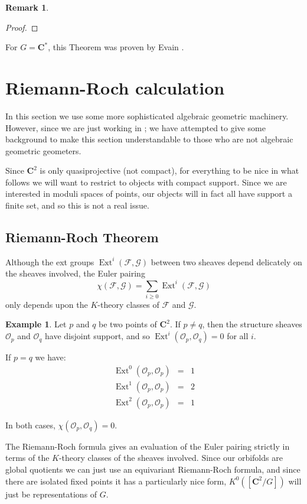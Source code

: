 \documentclass{amsart}[12pt]
\theoremstyle{definition}
\newtheorem{example}[dummy]{Example}
\newtheorem{remark}[dummy]{Remark}
\newcommand{\C}{\mathbf{C}}
\DeclareMathOperator{\Ext}{Ext}
\begin{document}
\begin{remark}
\begin{proof}
\end{proof}
For $G=\C^*$, this Theorem was proven by Evain \cite{evain1}.


\section{Riemann-Roch calculation}

In this section we use some more sophisticated algebraic geometric machinery.  However, since we are just working in ; we have attempted to give some background to make this section understandable to those who are not algebraic geometric geometers.

Since $\C^2$ is only quasiprojective (not compact), for everything to be nice in what follows we will want to restrict to objects with compact support.  Since we are interested in moduli spaces of points, our objects will in fact all have support a finite set, and so this is not a real issue.



\subsection{Riemann-Roch Theorem}
Although the ext groups $\Ext^i(\mathcal{F},\mathcal{G})$ between two sheaves depend delicately on the sheaves involved, the Euler pairing
$$\chi(\mathcal{F},\mathcal{G})=\sum_{i\geq 0} \Ext^i(\mathcal{F},\mathcal{G})$$
only depends upon the $K$-theory classes of $\mathcal{F}$ and $\mathcal{G}$.  

\begin{example}
Let $p$ and $q$ be two points of $\C^2$.  If $p\neq q$, then the structure sheaves $\mathcal{O}_p$ and $\mathcal{O}_q$ have disjoint support, and so $\Ext^i(\mathcal{O}_p,\mathcal{O}_q)=0$ for all $i$.

If $p=q$ we have:
\begin{eqnarray*}
\Ext^0(\mathcal{O}_p,\mathcal{O}_p)&=&1\\
\Ext^1(\mathcal{O}_p,\mathcal{O}_p)&=&2\\
\Ext^2(\mathcal{O}_p,\mathcal{O}_p)&=&1 
\end{eqnarray*}

In both cases, $\chi(\mathcal{O}_p,\mathcal{O}_q)=0$.
\end{example}

The Riemann-Roch formula gives an evaluation of the Euler pairing strictly in terms of the $K$-theory classes of the sheaves involved.  Since our orbifolds are global quotients we can just use an equivariant Riemann-Roch formula, and since there are isolated fixed points it has a particularly nice form,  $K^0([\C^2/G])$ will just be representations of $G$.



\end{remark}
\end{document}
